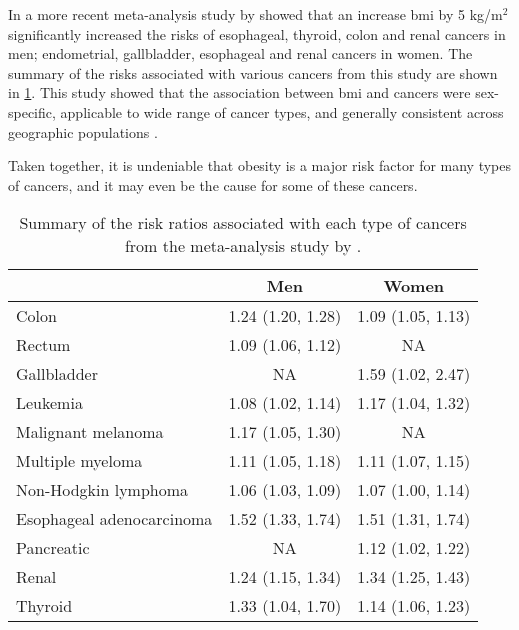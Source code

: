 In a more recent meta-analysis study by \citet{Renehan2008} showed that an increase \gls{bmi} by 5 kg/m$^2$ significantly increased the risks of esophageal, thyroid, colon and renal cancers in men; endometrial, gallbladder, esophageal and renal cancers in women.
The summary of the risks associated with various cancers from this study are shown in \cref{tab:renehan_cancer_risks}.
This study showed that the association between \gls{bmi} and cancers were sex-specific, applicable to wide range of cancer types, and generally consistent across geographic populations \citep{Renehan2008,Roberts2010}.

Taken together, it is undeniable that obesity is a major risk factor for many types of cancers, and it may even be the cause for some of these cancers.

\begin{table}[h]
	\centering
	\begin{threeparttable}
		\caption{Summary of the risk ratios associated with each type of cancers from the meta-analysis study by \citet{Renehan2008}.}
		\label{tab:renehan_cancer_risks}
		\begin{tabular}{lcc}
													   & Men               & Women\\
			\hline
			\rule{0pt}{2.25ex}Colon                 & 1.24 (1.20, 1.28) & 1.09 (1.05, 1.13)\\
			Rectum                                  & 1.09 (1.06, 1.12) & NA\tnote{3}\\
			Gallbladder                             & NA                & 1.59 (1.02, 2.47)\\
			Leukemia                                & 1.08 (1.02, 1.14) & 1.17 (1.04, 1.32)\\
			Malignant melanoma                      & 1.17 (1.05, 1.30) & NA\\
			Multiple myeloma                        & 1.11 (1.05, 1.18) & 1.11 (1.07, 1.15)\\
			Non-Hodgkin lymphoma                    & 1.06 (1.03, 1.09) & 1.07 (1.00, 1.14)\\
			Esophageal adenocarcinoma               & 1.52 (1.33, 1.74) & 1.51 (1.31, 1.74)\\
			Pancreatic                              & NA                & 1.12 (1.02, 1.22)\\
			Renal                                   & 1.24 (1.15, 1.34) & 1.34 (1.25, 1.43)\\
			Thyroid                                 & 1.33 (1.04, 1.70) & 1.14 (1.06, 1.23)\\

\end{tabular}
\end{threeparttable}
\end{table}
